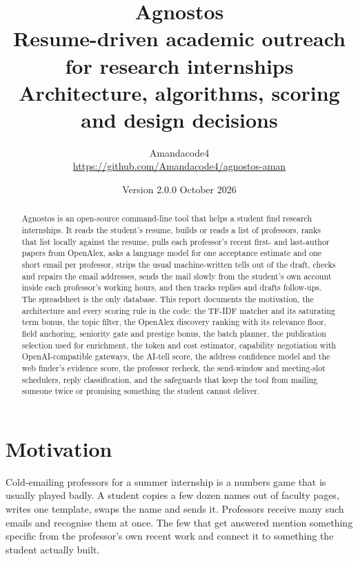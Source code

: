 \documentclass[11pt,a4paper]{article}
\title{\textbf{Agnostos}\\[4pt]\large Resume-driven academic outreach for research internships\\[2pt]
\normalsize Architecture, algorithms, scoring and design decisions}
\author{Amandacode4\\\small \url{https://github.com/Amandacode4/agnostos-aman}}
\date{Version 2.0.0 \quad October 2026}
\begin{document}
\maketitle

\begin{abstract}
Agnostos is an open-source command-line tool that helps a student find research internships. It
reads the student's resume, builds or reads a list of professors, ranks that list locally against
the resume, pulls each professor's recent first- and last-author papers from OpenAlex, asks a
language model for one acceptance estimate and one short email per professor, strips the usual
machine-written tells out of the draft, checks and repairs the email addresses, sends the mail
slowly from the student's own account inside each professor's working hours, and then tracks
replies and drafts follow-ups. The spreadsheet is the only database. This report documents the
motivation, the architecture and every scoring rule in the code: the TF-IDF matcher and its
saturating term bonus, the topic filter, the OpenAlex discovery ranking with its relevance floor,
field anchoring, seniority gate and prestige bonus, the batch planner, the publication
selection used for enrichment, the token and cost estimator, capability negotiation with
OpenAI-compatible gateways, the AI-tell score, the address confidence model and the web finder's
evidence score, the professor recheck, the send-window and meeting-slot schedulers, reply
classification, and the safeguards that keep the tool from mailing someone twice or promising
something the student cannot deliver.
\end{abstract}

\tableofcontents
\newpage

\section{Motivation}

Cold-emailing professors for a summer internship is a numbers game that is usually played badly.
A student copies a few dozen names out of faculty pages, writes one template, swaps the name and
sends it. Professors receive many such emails and recognise them at once. The few that get
answered mention something specific from the professor's own recent work and connect it to
something the student actually built.
\end{document}
